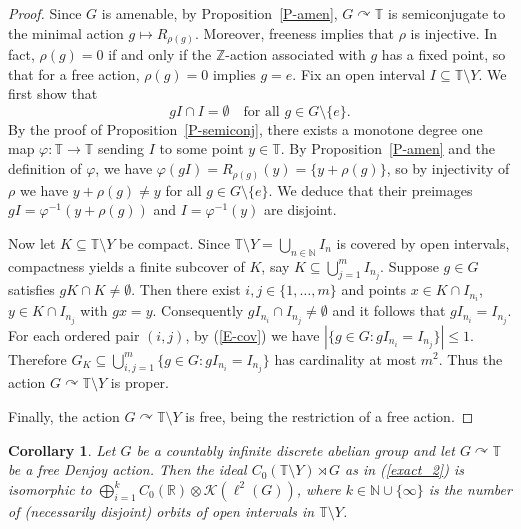 \documentclass[11pt,a4paper,leqno]{amsart}
\newtheorem{cor}[thm]{Corollary}
\theoremstyle{definition}
\theoremstyle{remark}
\numberwithin{equation}{section}
\theoremstyle{plain}
\newcommand{\Nb}{\mathbb{N}}
\newcommand{\Zb}{\mathbb{Z}}
\newcommand{\Tb}{\mathbb{T}}
\newcommand{\Rb}{\mathbb{R}}
\newcommand{\Kc}{\mathcal{K}}
\begin{document}
\begin{proof}
Since $G$ is amenable, by Proposition~\ref{P-amen}, $G\curvearrowright \Tb$ is semiconjugate to the minimal action $g\mapsto R_{\rho(g)}$. Moreover, freeness implies that $\rho$ is injective. In fact, $\rho(g) = 0$ if and only if the $\Zb$-action associated with $g$ has a fixed point, so that for a free action, $\rho(g) = 0$ implies $g = e$. Fix an open interval $I\subseteq \Tb \setminus Y$. We first show that 
\begin{equation}
	g I\cap I = \emptyset \quad \text{for all } g\in G\setminus \{e\}. \label{E-cov}
\end{equation} 
By the proof of Proposition~\ref{P-semiconj}, there exists a monotone degree one map $\varphi : \Tb\to\Tb$ sending $I$ to some point $y\in \Tb$. By Proposition~\ref{P-amen} and the definition of $\varphi$, we have $\varphi(gI) = R_{\rho(g)}(y) = \{y + \rho(g)\}$, so by injectivity of $\rho$ we have $y + \rho(g) \ne y$ for all $g\in G\setminus \{e\}$. We deduce that their preimages $gI = \varphi^{-1}(y+\rho(g))$ and $I = \varphi^{-1}(y)$ are disjoint. 

Now let $K\subseteq\mathbb T\setminus Y$ be compact. Since $\mathbb T\setminus Y = \bigcup_{n\in\Nb} I_n$ is covered by open intervals, compactness yields a finite subcover of $K$, say $K\subseteq\bigcup_{j=1}^m I_{n_j}$. Suppose $g\in G$ satisfies $gK\cap K\ne \emptyset$. Then there exist $i,j\in \{1,\dots,m\}$ and points $x\in K\cap I_{n_i}$, $y\in K\cap I_{n_j}$ with $gx=y$. Consequently $gI_{n_i}\cap I_{n_j}\neq \emptyset$ and it follows that $gI_{n_i}=I_{n_j}$. For each ordered pair $(i,j)$, by (\ref{E-cov}) we have $|\{g\in G : gI_{n_i} = I_{n_j}\}| \le 1$. Therefore $G_K\subseteq \bigcup_{i,j=1}^m\{g\in G : gI_{n_i} = I_{n_j}\}$ has cardinality at most $m^2$. Thus the action $G\curvearrowright\mathbb T\setminus Y$ is proper. 

Finally, the action $G\curvearrowright \Tb\setminus Y$ is free, being the restriction of a free action. 
\end{proof}

\begin{cor}\label{P-ideal}
    Let $G$ be a countably infinite discrete abelian group and let $G\curvearrowright \Tb$ be a free Denjoy action. Then the ideal $C_0(\Tb\setminus Y)\rtimes G$ as in (\ref{exact_2}) is isomorphic to $\bigoplus_{i=1}^{k} C_0(\Rb)\otimes \Kc(\ell^2(G))$, where $k \in \Nb \cup \{\infty\}$ is the number of (necessarily disjoint) orbits of open intervals in $\mathbb{T}\setminus Y$.
\end{cor}
\end{document}
